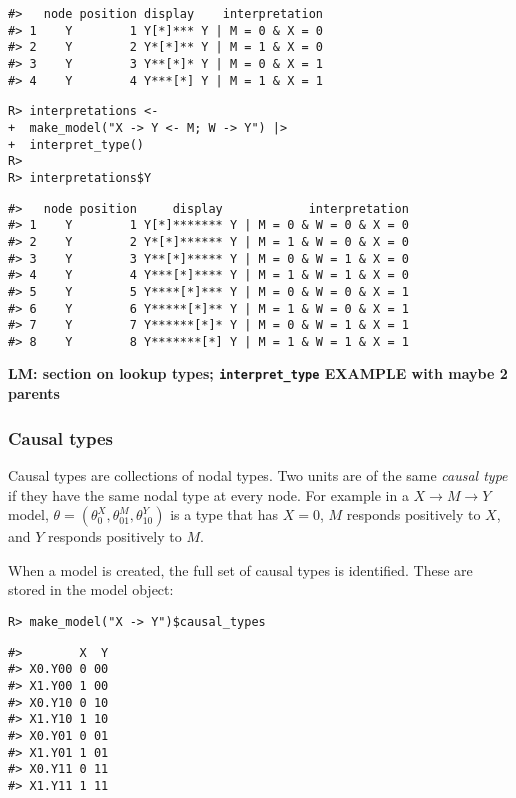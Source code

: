 \documentclass[
  11pt,
  article]{jss}
\begin{document}
\begin{verbatim}
#>   node position display    interpretation
#> 1    Y        1 Y[*]*** Y | M = 0 & X = 0
#> 2    Y        2 Y*[*]** Y | M = 1 & X = 0
#> 3    Y        3 Y**[*]* Y | M = 0 & X = 1
#> 4    Y        4 Y***[*] Y | M = 1 & X = 1
\end{verbatim}

\begin{verbatim}
R> interpretations <- 
+  make_model("X -> Y <- M; W -> Y") |> 
+  interpret_type()
R> 
R> interpretations$Y
\end{verbatim}

\begin{verbatim}
#>   node position     display            interpretation
#> 1    Y        1 Y[*]******* Y | M = 0 & W = 0 & X = 0
#> 2    Y        2 Y*[*]****** Y | M = 1 & W = 0 & X = 0
#> 3    Y        3 Y**[*]***** Y | M = 0 & W = 1 & X = 0
#> 4    Y        4 Y***[*]**** Y | M = 1 & W = 1 & X = 0
#> 5    Y        5 Y****[*]*** Y | M = 0 & W = 0 & X = 1
#> 6    Y        6 Y*****[*]** Y | M = 1 & W = 0 & X = 1
#> 7    Y        7 Y******[*]* Y | M = 0 & W = 1 & X = 1
#> 8    Y        8 Y*******[*] Y | M = 1 & W = 1 & X = 1
\end{verbatim}

\textbf{LM: section on lookup types; \texttt{interpret\_type} EXAMPLE
with maybe 2 parents}

\hypertarget{causal-types}{%
\subsubsection{Causal types}\label{causal-types}}

Causal types are collections of nodal types. Two units are of the same
\emph{causal type} if they have the same nodal type at every node. For
example in a \(X \rightarrow M \rightarrow Y\) model,
\(\theta = (\theta^X_0, \theta^M_{01}, \theta^Y_{10})\) is a type that
has \(X=0\), \(M\) responds positively to \(X\), and \(Y\) responds
positively to \(M\).

When a model is created, the full set of causal types is identified.
These are stored in the model object:

\begin{verbatim}
R> make_model("X -> Y")$causal_types
\end{verbatim}

\begin{verbatim}
#>        X  Y
#> X0.Y00 0 00
#> X1.Y00 1 00
#> X0.Y10 0 10
#> X1.Y10 1 10
#> X0.Y01 0 01
#> X1.Y01 1 01
#> X0.Y11 0 11
#> X1.Y11 1 11
\end{verbatim}
\end{document}
